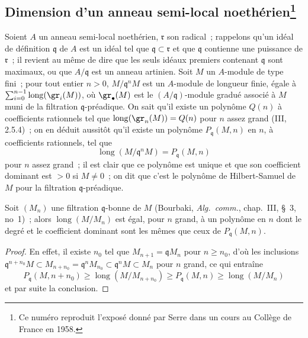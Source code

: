 \subsection[Dimension d'un anneau semi-local noethérien]{Dimension d'un
anneau semi-local noethérien\protect\footnote{Ce numéro reproduit l'exposé
donné par Serre dans un cours au Collège de France en 1958.}}
\label{subsection:0.16.2-fr}

\begin{env}[16.2.1]
\label{0.16.2.1-fr}
Soient $A$ un anneau semi-local noethérien, $\mathfrak{r}$ son radical~;
rappelons qu'un idéal de définition $\mathfrak{q}$ de $A$ est un idéal tel que
$\mathfrak{q}\subset\mathfrak{r}$ et que $\mathfrak{q}$ contienne une
puissance de $\mathfrak{r}$~; il revient au même de dire que les seuls idéaux
premiers contenant $\mathfrak{q}$ sont maximaux, ou que $A/\mathfrak{q}$ est
un anneau artinien. Soit $M$ un $A$-module de type fini~; pour tout entier
$n>0$, $M/\mathfrak{q}^nM$ est un $A$-module de longueur finie, égale à
$\sum_{i=0}^{n-1}\operatorname{long}(\gr_i(M))$, où $\gr_\bullet(M)$ est le
$(A/\mathfrak{q})$-module gradué associé à $M$ muni de la filtration
$\mathfrak{q}$-préadique. On sait qu'il existe un polynôme $Q(n)$ à
coefficients rationnels tel que $\operatorname{long}(\gr_n(M))=Q(n)$ pour $n$
assez grand (III, 2.5.4)~; on en déduit aussitôt qu'il existe un polynôme
$P_{\mathfrak{q}}(M,n)$ en $n$, à coefficients rationnels, tel que
\[
  \operatorname{long}(M/\mathfrak{q}^nM)=P_{\mathfrak{q}}(M,n)
\]
pour $n$ assez grand~; il est clair que ce polynôme est unique et que son
coefficient dominant est $>0$ si $M\neq0$~; on dit que c'est le polynôme de
Hilbert-Samuel de $M$ pour la filtration $\mathfrak{q}$-préadique.
\end{env}

\begin{lemma}[16.2.2.1]
\label{0.16.2.2.1-fr}
Soit $(M_n)$ une filtration $\mathfrak{q}$-bonne de $M$ (Bourbaki,
\emph{Alg.~comm.}, chap.~III, \S~3, no~1)~; alors
$\operatorname{long}(M/M_n)$ est égal, pour $n$ grand, à un polynôme en $n$
dont le degré et le coefficient dominant sont les mêmes que ceux de
$P_{\mathfrak{q}}(M,n)$.
\end{lemma}

\begin{proof}
En effet, il existe $n_0$ tel que $M_{n+1}=\mathfrak{q}M_n$ pour $n\geq n_0$,
d'où les inclusions
$\mathfrak{q}^{n+n_0}M\subset M_{n+n_0}=\mathfrak{q}^nM_{n_0}
\subset\mathfrak{q}^nM\subset M_n$ pour $n$ grand, ce qui entraîne
\[
  P_{\mathfrak{q}}(M,n+n_0)\geq
  \operatorname{long}(M/M_{n+n_0})\geq
  P_{\mathfrak{q}}(M,n)\geq\operatorname{long}(M/M_n)
\]
et par suite la conclusion.
\end{proof}


